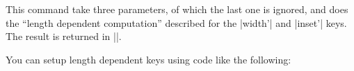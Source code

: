 \begin{command}{\pgfarrowslengthdependent{}}
    This command take three parameters, of which the last one is ignored, and
    does the ``length dependent computation'' described for the |width'| and
    |inset'| keys. The result is returned in |\pgf@x|.

    You can setup length dependent keys using code like the following:
\begin{codeexample}[code only]
\pgfkeys{/pgf/arrow keys/depth'/.code={%
  \pgfarrowsthreeparameters{#1}%
  \expandafter\pgfarrowsaddtolateoptions\expandafter{%
    \expandafter\pgfarrowslengthdependent\pgfarrowstheparameters%
    \pgfarrowdepth\pgf@x%
  }%
}
\end{codeexample}
\end{command}


